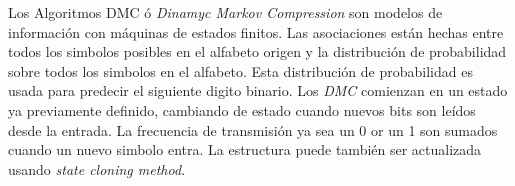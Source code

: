  
 Los Algoritmos DMC ó \emph{Dinamyc Markov Compression} son modelos de información con máquinas de estados finitos. Las asociaciones están hechas entre todos los simbolos posibles en el alfabeto origen y la distribución de probabilidad sobre todos los simbolos en el alfabeto. 
 Esta distribución de probabilidad es usada para predecir el siguiente digito binario. 
 Los \emph{DMC} comienzan en un estado ya previamente definido, cambiando de estado cuando nuevos bits son leídos desde la entrada. La frecuencia de transmisión ya sea un 0 or un 1 son sumados cuando un nuevo simbolo entra. La estructura puede también 
 ser actualizada usando \emph{state cloning method}.
 
 

\nocite{*}
